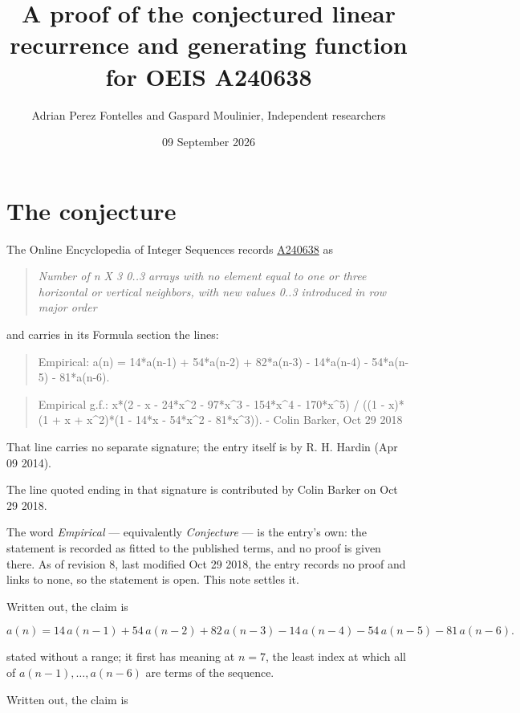 \documentclass[11pt]{article}
\title{A proof of the conjectured linear recurrence and generating function for OEIS A240638}
\author{Adrian Perez Fontelles and Gaspard Moulinier, Independent researchers}
\date{09 September 2026}
\theoremstyle{definition}
\begin{document}
\maketitle
\section{The conjecture}

The Online Encyclopedia of Integer Sequences records \href{https://oeis.org/A240638}{A240638} as

\begin{quote}\itshape Number of n X 3 0..3 arrays with no element equal to one or three horizontal or vertical neighbors, with new values 0..3 introduced in row major order\end{quote}

and carries in its Formula section the lines:

\begin{quote}\ttfamily Empirical: a(n) = 14*a(n-1) + 54*a(n-2) + 82*a(n-3) - 14*a(n-4) - 54*a(n-5) - 81*a(n-6).\end{quote}

\begin{quote}\ttfamily Empirical g.f.: x*(2 - x - 24*x\textasciicircum{}2 - 97*x\textasciicircum{}3 - 154*x\textasciicircum{}4 - 170*x\textasciicircum{}5) / ((1 - x)*(1 + x + x\textasciicircum{}2)*(1 - 14*x - 54*x\textasciicircum{}2 - 81*x\textasciicircum{}3)). - Colin Barker, Oct 29 2018\end{quote}

That line carries no separate signature; the entry itself is by R. H. Hardin (Apr 09 2014).

The line quoted ending in that signature is contributed by Colin Barker on Oct 29 2018.

The word {\itshape Empirical} --- equivalently {\itshape Conjecture} --- is the entry's own: the statement is recorded as fitted to the published terms, and no proof is given there. As of revision 8, last modified Oct 29 2018, the entry records no proof and links to none, so the statement is open. This note settles it.

Written out, the claim is

\[a(n) = 14\,a(n-1) + 54\,a(n-2) + 82\,a(n-3) - 14\,a(n-4) - 54\,a(n-5) - 81\,a(n-6).\]

stated without a range; it first has meaning at $n = 7$, the least index at which all of $a(n-1),\dots,a(n-6)$ are terms of the sequence.

Written out, the claim is
\end{document}
